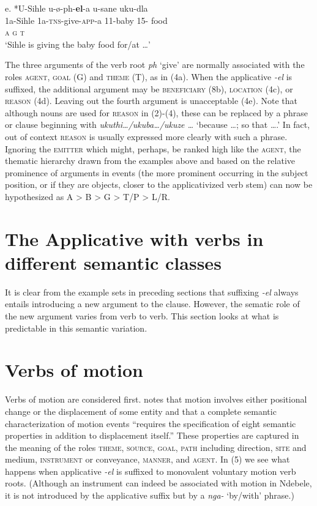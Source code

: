 \documentclass[output=paper]{langsci/langscibook}
\begin{document}
\gll   e.    *U-Sihle   u-ø-ph-\textbf{el}{}-a        u-sane     uku-dla       \\
         1a-Sihle   1a-\textsc{tns}{}-give-\textsc{app}{}-a   11-baby     15- food   \\
         \textsc{a                  g      t}\\
\glt     ‘Sihle is giving the baby food for/at …’
\z

The three arguments of the verb root \textit{ph} ‘give’ are normally associated with the roles \textsc{agent}, \textsc{goal} (G) and \textsc{theme} (T), as in (4a). When the applicative \textit{{}-el} is suffixed, the additional argument may be \textsc{beneficiary} (8b), \textsc{location} (4c), or \textsc{reason} (4d). Leaving out the fourth argument is unacceptable (4e). Note that although nouns are used for \textsc{reason} in (2)-(4), these can be replaced by a phrase or clause beginning with \textit{ukuthi…/ukuba…/ukuze …} ‘because …; so that ….’ In fact, out of context \textsc{reason} is usually expressed more clearly with such a phrase. Ignoring the \textsc{emitter} which might, perhaps, be ranked high like the \textsc{agent}, the thematic hierarchy drawn from the examples above and based on the relative prominence of arguments in events (the more prominent occurring in the subject position, or if they are objects, closer to the applicativized verb stem) can now be hypothesized as A {\textgreater} B {\textgreater} G {\textgreater} T/P {\textgreater} L/R.  

\section{ The Applicative with verbs in different semantic classes}

It is clear from the example sets in preceding sections that suffixing \textit{{}-el} always entails introducing a new argument to the clause. However, the sematic role of the new argument varies from verb to verb. This section looks at what is predictable in this semantic variation.

\section{Verbs of motion }

Verbs of motion are considered first. \citet[171]{Frawley1992} notes that motion involves either positional change or the displacement of some entity and that a complete semantic characterization of motion events “requires the specification of eight semantic properties in addition to displacement itself.” These properties are captured in the meaning of the roles \textsc{theme}, \textsc{source}, \textsc{goal}, \textsc{path} including direction, \textsc{site} and medium, \textsc{instrument} or conveyance, \textsc{manner}, and \textsc{agent}. In (5) we see what happens when applicative \textit{{}-el} is suffixed to monovalent voluntary motion verb roots. (Although an instrument can indeed be associated with motion in Ndebele, it is not introduced by the applicative suffix but by a \textit{nga-} ‘by/with’ phrase.)
\end{document}
